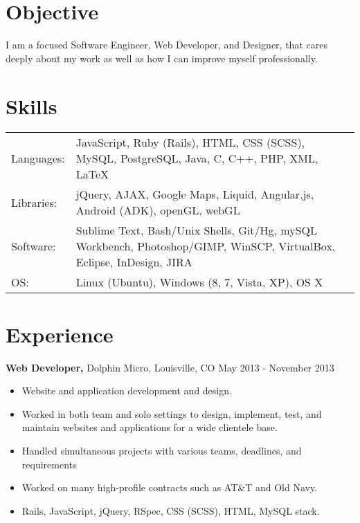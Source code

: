 \documentclass[margin]{res}
\begin{document}
 
 

\address{  mitchell.a.goudy@gmail.com \\ mitchellgoudy.com \\ https://github.com/mgoudy91 \\ }

\address{ (720) 480-7126 \\ 2119 Spruce Street \#3 \\ Boulder, CO 80302 }

\begin{resume} 
 
\section{Objective} 
  I am a focused Software Engineer, Web Developer, and Designer, that cares deeply about my work as well as how I can improve myself professionally. 

\section{Skills}
   \begin{tabular}{l p{5.0in}}
    {Languages:} & JavaScript, Ruby (Rails), HTML, CSS (SCSS), MySQL, PostgreSQL, Java, C, C++, PHP, XML, LaTeX \\ [0.5ex]
    {Libraries:} & jQuery, AJAX, Google Maps, Liquid, Angular.js, Android (ADK), openGL, webGL \\ [0.5ex]
    {Software:} & Sublime Text, Bash/Unix Shells, Git/Hg, mySQL Workbench, Photoshop/GIMP, WinSCP, VirtualBox, Eclipse, InDesign, JIRA \\ [0.5ex]
    {OS:} & Linux (Ubuntu), Windows (8, 7, Vista, XP), OS X \\ [0.5ex]
   \end{tabular}

\section{Experience}
 {\bf Web Developer,} Dolphin Micro, Louisville, CO  \hfill May 2013 - November 2013
 \begin{itemize} \itemsep -2pt  %
 \item Website and application development and design.
 \item Worked in both team and solo settings to design, implement, test, and maintain websites and applications for a wide clientele base.
 \item Handled simultaneous projects with various teams, deadlines, and requirements
 \item Worked on many high-profile contracts such as AT\&T and Old Navy.
 \item Rails, JavaScript, jQuery, RSpec, CSS (SCSS), HTML, MySQL stack.
 \end{itemize}


\end{resume}
\end{document}
